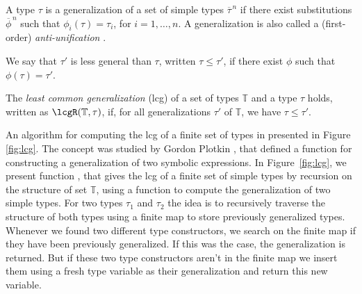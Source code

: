 A type $\tau$ is a generalization of a set of simple types
$\overline{\tau}^{\,n}$ if there exist substitutions
$\overline{\phi}^{\,n}$ such that $\phi_i(\tau)=\tau_i$, for
$i=1,\ldots,n$. A generalization is also called a (first-order) {\em
  anti-unification\/} \cite{ModelTheory2012}.

We say that $\tau'$ is less general than $\tau$, written $\tau \leq
\tau'$, if there exist $\phi$ such that $\phi(\tau) = \tau'$.

The {\it least common generalization} (lcg) of a set of types
$\mathbb{T}$ and a type $\tau$ holds, written as
$\lcgR(\mathbb{T},\tau)$, if, for all generalizations $\tau'$ of
$\mathbb{T}$, we have $\tau \leq \tau'$.

An algorithm for computing the lcg of a finite set of types in
presented in Figure \ref{fig:lcg}. The concept was studied by Gordon
Plotkin \cite{plotkin1970note,plotkin1971further}, that defined a
function for constructing a generalization of two symbolic
expressions.  In Figure~\ref{fig:lcg}, we present function \lcg, that
gives the lcg of a finite set of simple types by recursion on the
structure of set $\mathbb{T}$, using a function to compute the
generalization of two simple types. For two types $\tau_1$ and
$\tau_2$ the idea is to recursively traverse the structure of both
types using a finite map to store previously generalized
types. Whenever we found two different type constructors, we search on
the finite map if they have been previously generalized. If this was
the case, the generalization is returned. But if these two type
constructors aren't in the finite map we insert them using a fresh
type variable as their generalization and return this new variable.


